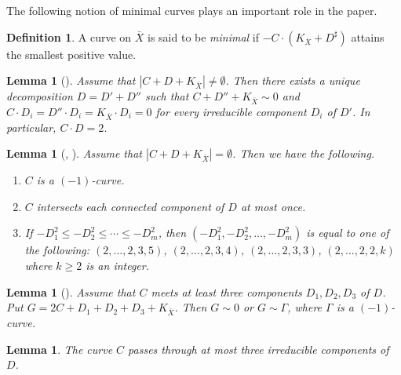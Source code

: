\documentclass[10pt,oneside,reqno]{amsart}
\newtheorem{lemma}[theorem]{Lemma}
\theoremstyle{definition}
\newtheorem{definition}[theorem]{Definition}
\theoremstyle{remark}
\numberwithin{equation}{section}
\begin{document}
The following notion of minimal curves plays an important role in the paper.

\begin{definition}
A curve on $\bar{X}$ is said to be \emph{minimal} if $-C\cdot (K_{\bar{X}}+D^\sharp)$ attains the smallest positive value.
\end{definition}


\begin{lemma}[{\cite[Lemma 2.1]{Zh}}]
\label{Zhan1}
Assume that $|C+D+K_{\bar{X}}|\neq\emptyset$. Then there exists a unique decomposition $D=D'+D''$ such that $C+D''+K_{\bar{X}}\sim 0$ and $C\cdot D_i=D''\cdot D_i=K_{\bar{X}}\cdot D_i=0$ for every irreducible component $D_i$ of $D'$. In particular, $C\cdot D = 2$.
\end{lemma}

\begin{lemma}[{\cite[Lemma 2.2]{Zh}, \cite[Lemma 4.1 and Proof of Theorem 1.2]{B}}]
\label{Zhan2}
Assume that $|C+D+K_{\bar{X}}|=\emptyset$. Then we have the following.
    \begin{enumerate}
    \item $C$ is a $(-1)$-curve.
    \item $C$ intersects each connected component of $D$ at most once.
    \item If $-D_1^2\leq -D_2^2\leq\cdots\leq -D_m^2$, then $(-D_1^2,-D_2^2,\ldots, -D_m^2)$ is equal to one of the following: $(2,\ldots,2,3,5)$, $(2,\ldots,2,3,4)$, $(2,\ldots,2,3,3)$, $(2,\ldots,2,2,k)$ where $k \geq 2$ is an integer.
    \end{enumerate}
\end{lemma}



\begin{lemma}[{\cite[Lemma 2.3]{Zh}}]
\label{Zhan3}
Assume that $C$ meets at least three components $D_1,D_2,D_3$ of $D$. Put $G=2C+D_1+D_2+D_3+K_{\bar{X}}$. Then $G\sim 0$ or $G\sim\Gamma$, where $\Gamma$ is a $(-1)$-curve.
\end{lemma}

\begin{lemma}
\label{Pr2}
The curve $C$ passes through at most three irreducible components of $D$.
\end{lemma}
\end{document}
